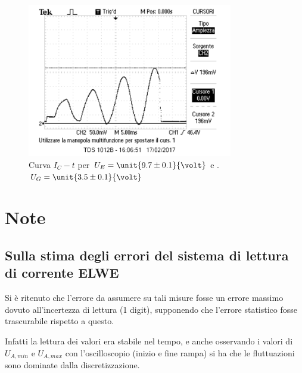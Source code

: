 \documentclass[10pt,a4paper]{article}
\begin{document}
\begin{figure}[h!]
	\centering
	\includegraphics[width=0.80\textwidth]{../oscilloscopio/Task6_3.png}
	\caption{Curva $I_{C} - t$ per $U_{E}=\unit{9.7 \pm 0.1}{\volt}$ e .$U_{G}=\unit{3.5 \pm 0.1}{\volt}$}
	\label{task6.3}
\end{figure}

\section{Note}

\subsection{Sulla stima degli errori del sistema di lettura di corrente ELWE}
\label{errELWE}
Si è ritenuto che l'errore da assumere su tali misure fosse un errore massimo dovuto all'incertezza di lettura (1 digit), supponendo che l'errore statistico fosse trascurabile rispetto a questo.

Infatti la lettura dei valori era stabile nel tempo, e anche osservando i valori di $U_{A, min}$ e $U_{A, max}$ con l'oscilloscopio (inizio e fine rampa) si ha che le fluttuazioni sono dominate dalla discretizzazione.

\subsection{}

\end{document}
